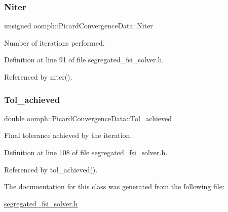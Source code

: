 \subsubsection{\texorpdfstring{Niter}{Niter}}
{\footnotesize\ttfamily unsigned oomph\+::\+Picard\+Convergence\+Data\+::\+Niter\hspace{0.3cm}{\ttfamily [private]}}



Number of iterations performed. 



Definition at line 91 of file segregated\+\_\+fsi\+\_\+solver.\+h.



Referenced by niter().

\mbox{\label{classoomph_1_1PicardConvergenceData_af2fad7cea38c640c90f1784491695684}} 
\subsubsection{\texorpdfstring{Tol\+\_\+achieved}{Tol\_achieved}}
{\footnotesize\ttfamily double oomph\+::\+Picard\+Convergence\+Data\+::\+Tol\+\_\+achieved\hspace{0.3cm}{\ttfamily [private]}}



Final tolerance achieved by the iteration. 



Definition at line 108 of file segregated\+\_\+fsi\+\_\+solver.\+h.



Referenced by tol\+\_\+achieved().



The documentation for this class was generated from the following file\+:\begin{DoxyCompactItemize}
\item 
\hyperlink{segregated__fsi__solver_8h}{segregated\+\_\+fsi\+\_\+solver.\+h}\end{DoxyCompactItemize}
